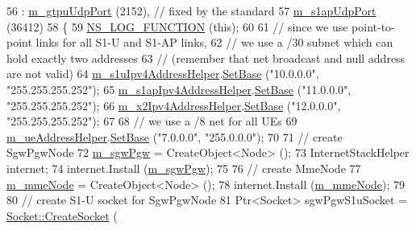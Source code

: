 \begin{DoxyCode}
56   : \hyperlink{classns3_1_1PointToPointEpcHelper_afe0543e08ac6d9ed1861e0685ca06ab1}{m\_gtpuUdpPort} (2152),  \textcolor{comment}{// fixed by the standard}
57     \hyperlink{classns3_1_1PointToPointEpcHelper_a54827f1909b73bb956bb6f12e098c367}{m\_s1apUdpPort} (36412)
58 \{
59   \hyperlink{log-macros-disabled_8h_a90b90d5bad1f39cb1b64923ea94c0761}{NS\_LOG\_FUNCTION} (\textcolor{keyword}{this});
60 
61   \textcolor{comment}{// since we use point-to-point links for all S1-U and S1-AP links, }
62   \textcolor{comment}{// we use a /30 subnet which can hold exactly two addresses }
63   \textcolor{comment}{// (remember that net broadcast and null address are not valid)}
64   \hyperlink{classns3_1_1PointToPointEpcHelper_a0566b197857168bbad76f8c72fd849d6}{m\_s1uIpv4AddressHelper}.\hyperlink{classns3_1_1Ipv4AddressHelper_acf7b16dd25bac67e00f5e25f90a9a035}{SetBase} (\textcolor{stringliteral}{"10.0.0.0"}, \textcolor{stringliteral}{"255.255.255.252"});
65   \hyperlink{classns3_1_1PointToPointEpcHelper_a0c26058a4a24008dbfe7023ebc6a00af}{m\_s1apIpv4AddressHelper}.\hyperlink{classns3_1_1Ipv4AddressHelper_acf7b16dd25bac67e00f5e25f90a9a035}{SetBase} (\textcolor{stringliteral}{"11.0.0.0"}, \textcolor{stringliteral}{"255.255.255.252"});
66   \hyperlink{classns3_1_1PointToPointEpcHelper_a76f33ada1109b59e1c790703db453c89}{m\_x2Ipv4AddressHelper}.\hyperlink{classns3_1_1Ipv4AddressHelper_acf7b16dd25bac67e00f5e25f90a9a035}{SetBase} (\textcolor{stringliteral}{"12.0.0.0"}, \textcolor{stringliteral}{"255.255.255.252"});
67 
68   \textcolor{comment}{// we use a /8 net for all UEs}
69   \hyperlink{classns3_1_1PointToPointEpcHelper_a622990871d0bc28bceae79accc9cdf43}{m\_ueAddressHelper}.\hyperlink{classns3_1_1Ipv4AddressHelper_acf7b16dd25bac67e00f5e25f90a9a035}{SetBase} (\textcolor{stringliteral}{"7.0.0.0"}, \textcolor{stringliteral}{"255.0.0.0"});
70   
71   \textcolor{comment}{// create SgwPgwNode}
72   \hyperlink{classns3_1_1PointToPointEpcHelper_a4adab05b0300264e93a3a81f249dfbd8}{m\_sgwPgw} = CreateObject<Node> ();
73   InternetStackHelper internet;
74   internet.Install (\hyperlink{classns3_1_1PointToPointEpcHelper_a4adab05b0300264e93a3a81f249dfbd8}{m\_sgwPgw});
75 
76   \textcolor{comment}{// create MmeNode}
77   \hyperlink{classns3_1_1PointToPointEpcHelper_a426c5c35e890ce608c925348e4023b0f}{m\_mmeNode} = CreateObject<Node> ();
78   internet.Install (\hyperlink{classns3_1_1PointToPointEpcHelper_a426c5c35e890ce608c925348e4023b0f}{m\_mmeNode});
79   
80   \textcolor{comment}{// create S1-U socket for SgwPgwNode}
81   Ptr<Socket> sgwPgwS1uSocket = \hyperlink{classns3_1_1Socket_ad448a62bb50ad3dbac59c879a885a8d2}{Socket::CreateSocket} (

\end{DoxyCode}
